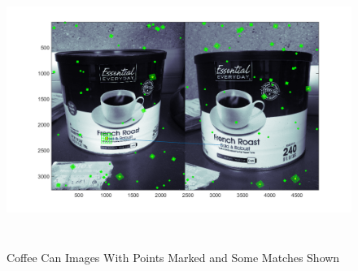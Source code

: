 \documentclass[11pt,psfig]{article}
\begin{document}
\begin{figure}[H]
\centering
\includegraphics[height=3.5in]{coffeeCan_pointsWithMatching.png}
\caption{Coffee Can Images With Points Marked and Some Matches Shown}
\label{cc3}
\end{figure}

%
\end{document}
